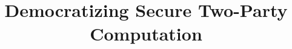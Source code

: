 \documentclass[conference,compsoc]{IEEEtran}
\begin{document}
\title{Democratizing Secure Two-Party Computation}





\maketitle
\IEEEpeerreviewmaketitle


\graphicspath{{./Images/}}














\newpage


\balance

\appendix

\end{document}
